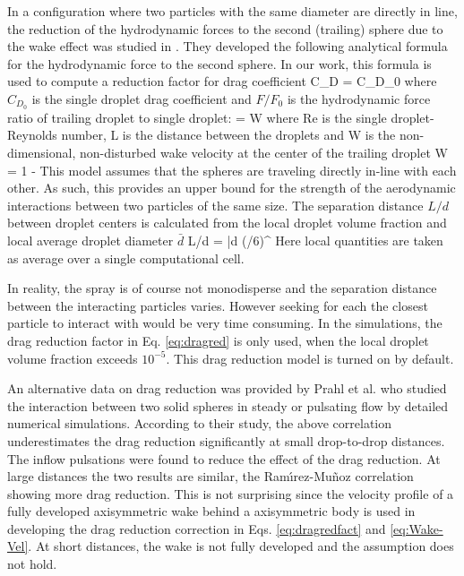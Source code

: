 In a configuration where two particles with the same diameter are directly in
line, the reduction of the hydrodynamic forces to the second (trailing) sphere due
to the wake effect was studied in \cite{Ramirez:1}. They developed the following analytical
formula for the hydrodynamic force to the second sphere. In our work, this
formula is used to compute a reduction factor for drag coefficient
\be
  C_D = C_{D_0}  \label{eq:dragred}
\ee
where $C_{D_0}$ is the single droplet drag coefficient and $F / F_0$ is the
hydrodynamic force ratio of trailing droplet to single droplet:
\be
   = W  \label{eq:dragredfact}
\ee
where Re is the single droplet-Reynolds number, L is the distance between the
droplets and W is the non-dimensional, non-disturbed wake velocity at the
center of the trailing droplet
\be
  W = 1 -   \label{eq:Wake-Vel}
\ee
This model assumes that the spheres are traveling directly in-line with each
other. As such, this provides an upper bound for the strength of the
aerodynamic interactions between two particles of the same size. The separation distance $L/d$ between droplet centers is calculated from the local droplet volume fraction and local average droplet diameter $\bar{d}$
\be
  L/d = \bar{d} \left(\pi/6\alpha \right)^{}
\ee
Here local quantities are taken as average over a single computational cell. 

In reality, the spray is of course not monodisperse and the separation distance between the interacting particles varies. However seeking for each the closest particle to interact with would be very time consuming. In the simulations, the drag reduction factor in Eq.
\ref{eq:dragred} is only used, when the local droplet volume fraction exceeds
$10^{- 5}$. This drag reduction model is turned on by default.

An alternative data on drag reduction was provided by Prahl et al. \cite{Prahl:1} who studied the interaction between two solid spheres in steady or pulsating flow by detailed numerical simulations. According to their study, the above correlation underestimates the drag reduction significantly at small drop-to-drop distances. The inflow pulsations were found to reduce the effect of the drag reduction. At large distances the two results are similar, the Ram\'{\i}rez-Mu\~{n}oz correlation showing more drag reduction. This is not surprising since the velocity profile of a fully developed axisymmetric wake behind a axisymmetric body is used in developing the drag reduction correction in Eqs. \ref{eq:dragredfact} and \ref{eq:Wake-Vel}. At short distances, the wake is not fully developed and the assumption does not hold. 

